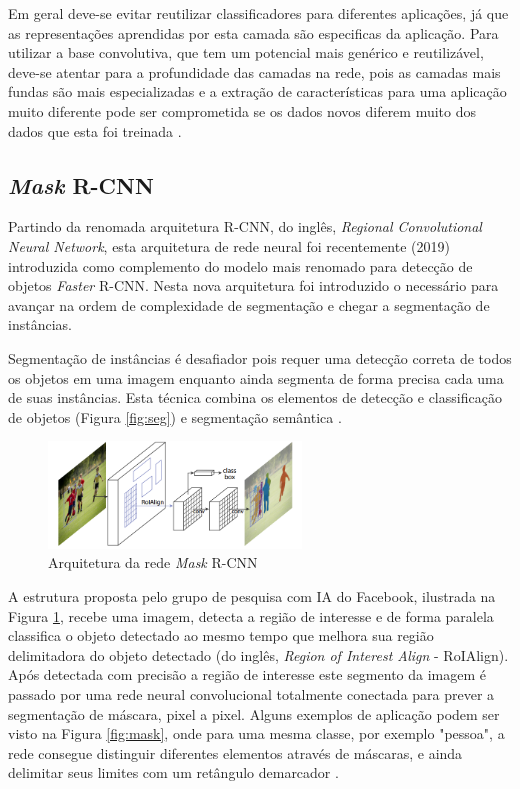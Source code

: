 \documentclass[12pt]{report}
\newcommand*{\captionsource}[2]{%
  \caption[{#1}]{%
    #1%
    \\\hspace{\linewidth}%
     \text{Fonte:}#2%
  }%
}
\begin{document}
Em geral deve-se evitar reutilizar classificadores para diferentes aplicações, já que as representações aprendidas por esta camada são especificas da aplicação. Para utilizar a base convolutiva, que tem um potencial mais genérico e reutilizável, deve-se atentar para a profundidade das camadas na rede, pois as camadas mais fundas são mais especializadas e a extração de características para uma aplicação muito diferente pode ser comprometida se os dados novos diferem muito dos dados que esta foi treinada \cite{chollet}.

\subsection{\textit{Mask} R-CNN}

Partindo da renomada arquitetura R-CNN, do inglês, \textit{Regional Convolutional Neural Network}, esta arquitetura de rede neural foi recentemente (2019) introduzida como complemento do modelo mais renomado para detecção de objetos \textit{Faster} R-CNN. Nesta nova arquitetura foi introduzido o necessário para avançar na ordem de complexidade de segmentação e chegar a segmentação de instâncias. 

Segmentação de instâncias é desafiador pois requer uma detecção correta de todos os objetos em uma imagem enquanto ainda segmenta de forma precisa cada uma de suas instâncias. Esta técnica combina os elementos de detecção e classificação de objetos (Figura \ref{fig:seg}) e segmentação semântica \cite{maskrcnn}.

\begin{figure}
    \centering
    \includegraphics[width=0.6\textwidth]{images/futebol.png}
    \captionsource{Arquitetura da rede \textit{Mask} R-CNN}{ \protect\cite{maskrcnn}}
    \label{fig:futebol}
\end{figure}

A estrutura proposta pelo grupo de pesquisa com \ac{IA} do Facebook, ilustrada na Figura \ref{fig:futebol}, recebe uma imagem, detecta a região de interesse e de forma paralela classifica o objeto detectado ao mesmo tempo que melhora sua região delimitadora do objeto detectado (do inglês, \textit{Region of Interest Align} - RoIAlign). Após detectada com precisão a região de interesse este segmento da imagem é passado por uma rede neural convolucional totalmente conectada para prever a segmentação de máscara, pixel a pixel. Alguns exemplos de aplicação podem ser visto na Figura \ref{fig:mask}, onde para uma mesma classe, por exemplo "pessoa", a rede consegue distinguir diferentes elementos através de máscaras, e ainda delimitar seus limites com um retângulo demarcador \cite{maskrcnn}. 
\end{document}
